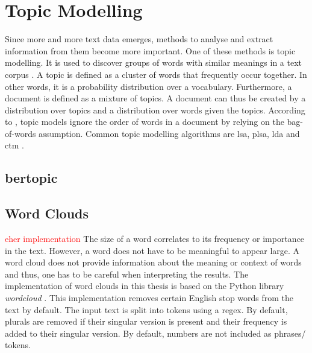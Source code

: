 \section{Topic Modelling}\label{sec:topic-modelling}

Since more and more text data emerges, methods to analyse and extract information from them become more important.
One of these methods is topic modelling.
It is used to discover groups of words with similar meanings in a text corpus \cite{topic_modeling2015}.
A topic is defined as a cluster of words that frequently occur together.
In other words, it is a probability distribution over a vocabulary.
Furthermore, a document is defined as a mixture of topics.
A document can thus be created by a distribution over topics and a distribution over words given the topics.
According to \citeauthor{topic_modeling2015}, topic models ignore the order of words in a document by relying on the bag-of-words assumption.
Common topic modelling algorithms are \ac{lsa}, \ac{plsa}, \ac{lda} and \ac{ctm} \cite{topic_modeling2015}.




\subsection{\ac{bertopic}}\label{subsec:bertopic}






\subsection{Word Clouds}\label{subsec:word-clouds}

\textcolor{red}{eher implementation}
The size of a word correlates to its frequency or importance in the text.
However, a word does not have to be meaningful to appear large.
A word cloud does not provide information about the meaning or context of words and thus, 
one has to be careful when interpreting the results.
The implementation of word clouds in this thesis is based on the Python library \textit{wordcloud} \cite{wordcloud-dev}.
This implementation removes certain English stop words from the text by default.
The input text is split into tokens using a regex.
By default, plurals are removed if their singular version is present and their frequency is added to their singular version.
By default, numbers are not included as phrases/ tokens.